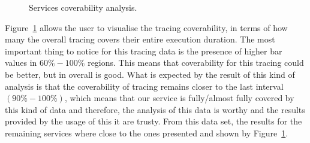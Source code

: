 \begin{figure}[H]
  \caption{Services coverability analysis.}
  \label{fig:services_coverability_analysis}
\end{figure}

Figure~\ref{fig:services_coverability_analysis} allows the user to visualise the tracing coverability, in terms of how many the overall tracing covers their entire execution duration. The most important thing to notice for this tracing data is the presence of higher bar values in $60\%-100\%$ regions. This means that coverability for this tracing could be better, but in overall is good. What is expected by the result of this kind of analysis is that the coverability of tracing remains closer to the last interval $(90\%-100\%)$, which means that our service is fully/almost fully covered by this kind of data and therefore, the analysis of this data is worthy and the results provided by the usage of this it are trusty. From this data set, the results for the remaining services where close to the ones presented and shown by Figure~\ref{fig:services_coverability_analysis}.

